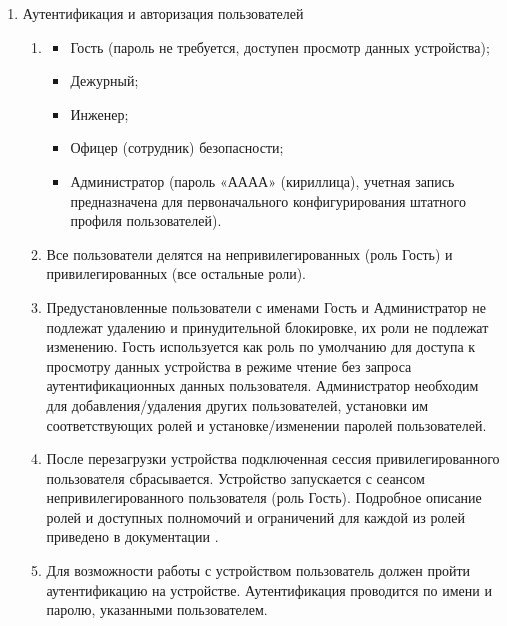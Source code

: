 \begin{enumerate}[label=\arabic{section}.\arabic{subsection}.\arabic*, labelsep=7pt, leftmargin=0pt, itemindent=60pt, align=left]
\begin{enumerate}
\end{enumerate}

\item Аутентификация и авторизация пользователей
\begin{enumerate}

\item 
{}
\begin{itemize}
\item Гость (пароль не требуется, доступен просмотр данных устройства);
\item Дежурный;
\item Инженер;
\item Офицер (сотрудник) безопасности;
\item Администратор (пароль «АААА» (кириллица), учетная запись предназначена для первоначального конфигурирования штатного профиля пользователей).
\end{itemize}

\item 
Все пользователи делятся на непривилегированных (роль Гость) и привилегированных (все остальные роли).

\item
Предустановленные пользователи с именами Гость и Администратор не подлежат удалению и принудительной блокировке, их роли не подлежат изменению.
Гость используется как роль по умолчанию для доступа к просмотру данных устройства в режиме чтение без запроса аутентификационных данных пользователя.
Администратор необходим для добавления/удаления других пользователей, установки им соответствующих ролей и установке/изменении паролей пользователей.

\item
После перезагрузки устройства подключенная сессия привилегированного пользователя сбрасывается.
Устройство запускается с сеансом непривилегированного пользователя (роль Гость).
Подробное описание ролей и доступных полномочий и ограничений для каждой из ролей приведено в документации \ManualUnitGeneral.

\item
Для возможности работы с устройством пользователь должен пройти аутентификацию на устройстве.
Аутентификация проводится по имени и паролю, указанными пользователем. 


\end{enumerate}
\end{enumerate}
